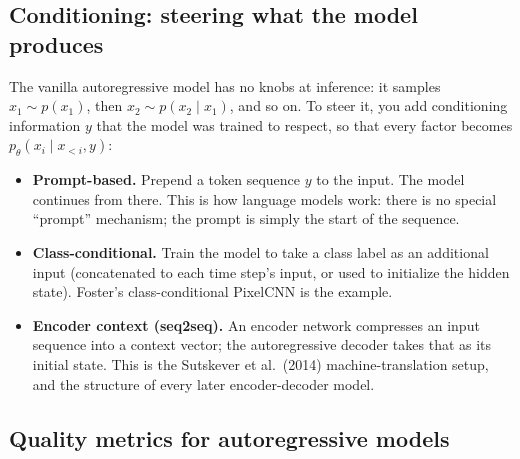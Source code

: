 \documentclass[11pt]{article}
\theoremstyle{remark}
\begin{document}
\subsection{Conditioning: steering what the model produces}

The vanilla autoregressive model has no knobs at inference: it samples $x_1 \sim p(x_1)$, then $x_2 \sim p(x_2 \mid x_1)$, and so on. To steer it, you add conditioning information $y$ that the model was trained to respect, so that every factor becomes $p_\theta(x_i \mid x_{<i}, y)$:
\begin{itemize}
\item \textbf{Prompt-based.} Prepend a token sequence $y$ to the input. The model continues from there. This is how language models work: there is no special ``prompt'' mechanism; the prompt is simply the start of the sequence.
\item \textbf{Class-conditional.} Train the model to take a class label as an additional input (concatenated to each time step's input, or used to initialize the hidden state). Foster's class-conditional PixelCNN is the example.
\item \textbf{Encoder context (seq2seq).} An encoder network compresses an input sequence into a context vector; the autoregressive decoder takes that as its initial state. This is the Sutskever et al.\ (2014) machine-translation setup, and the structure of every later encoder-decoder model.
\end{itemize}

\subsection{Quality metrics for autoregressive models}
\end{document}
